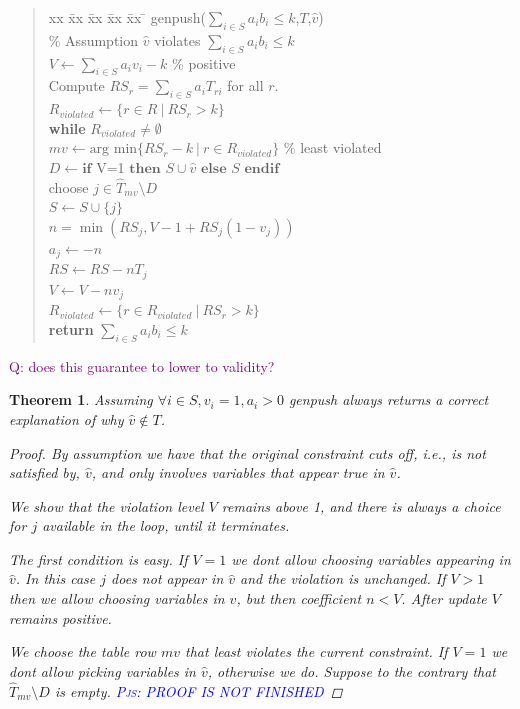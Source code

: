 \documentclass{article}
\newtheorem{theorem}{Theorem}
\newcommand{\question}[1]{\textcolor{purple}{\textsc{Q:} #1}}
\newcommand{\pjs}[1]{\textcolor{blue}{\textsc{Pjs:} #1}}
\begin{document}
\begin{quote} 
\begin{tabbing}
    xx \= xx \= xx \= xx \= xx \= \kill
    \textsf{genpush}($\sum_{i \in S} a_i b_i \leq k$,$T$,$\hat{v}$) \\
    \> \% Assumption $\hat{v}$ violates $\sum_{i \in S} a_i b_i \leq k$ \\
    \> $V \gets \sum_{i \in S} a_i v_i - k$ \% positive \\
    \> Compute $RS_r = \sum_{i \in S} a_i T_{ri}$ for all $r$. \\
    \> $R_{violated} \gets \{ r \in R ~|~ RS_r > k\}$ \\
    \> \textbf{while} $R_{violated} \neq \emptyset$ \\
    \> \> $mv \gets \text{arg min}\{ RS_r - k ~|~ r \in R_{violated}\}$ \% least violated \\
    \> \> $D \gets \textbf{if~} $V=1$ \textbf{~then~} S \cup \hat{v} \textbf{~else~} S \textbf{~endif}$ \\
    \> \> choose $j \in \hat{T}_{mv} \setminus D$ \\
    \>\>  $S \gets S \cup \{j\}$ \\
    \>\>  $n = \min (RS_j, V-1 + RS_j (1-v_j))$ \\
    \>\>  $a_j \gets -n$ \\
    \>\> $RS \gets RS - n T_j$ \\
    \>\> $V \gets V - n v_j$ \\
    \> \> $R_{violated} \gets \{ r \in R_{violated} ~|~ RS_r > k\}$ \\
    \> \textbf{return} $\sum_{i \in S} a_i b_i \leq k$
\end{tabbing}
\end{quote}

\question{does this guarantee to lower to validity?}

\begin{theorem}
    Assuming $\forall i \in S, v_i = 1, a_i > 0$
    \textsf{genpush} always returns a correct explanation of why $\hat{v} \not\in T$. 
    \begin{proof}
        By assumption we have that the original constraint cuts off, i.e., is not satisfied by, $\hat{v}$, and only involves variables that appear true in $\hat{v}$.

        We show that the violation level $V$ remains above 1, and there is always a choice for $j$ available in the loop, until it terminates.

        The first condition is easy. If $V=1$ we dont allow choosing variables appearing in $\hat{v}$. In this case $j$ does not appear in $\hat{v}$ and the violation is unchanged. If $V > 1$ then we allow choosing variables in $\hat{v}$, but then coefficient $n < V$. After update $V$ remains positive. 

        We choose the table row $mv$ that least violates the current constraint. 
        If $V = 1$ we dont allow picking variables in $\hat{v}$, otherwise we do.
        Suppose to the contrary that $\hat{T}_{mv} \setminus D$ is empty. 
        \pjs{PROOF IS NOT FINISHED}
    \end{proof}
\end{theorem}
\end{document}
